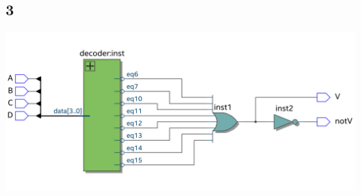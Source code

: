 \documentclass{article}
\begin{document}
\subsection*{3}
\includegraphics*[width=\textwidth]{impl3}
\end{document}
